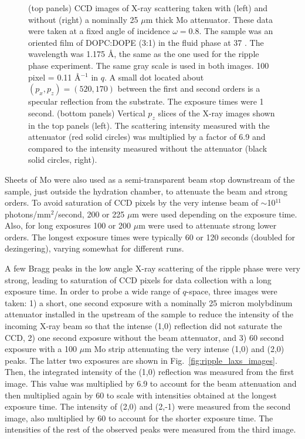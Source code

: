 \begin{figure}[jtbp]
  \caption{(top panels) CCD images of X-ray scattering taken with (left) and without 
  (right) a nominally 25 $\mu$m thick Mo attenuator. These data were taken 
  at a fixed angle of incidence $\omega=0.8$\textdegree. The sample was an oriented film of 
  DOPC:DOPE (3:1) in the fluid phase at 37 \textcelsius. The wavelength
  was 1.175 \AA, the same as the one used for the ripple phase experiment.
  The same gray scale is used in both images. 100 pixel =  0.11 \AA$^{-1}$ in $q$. 
  A small dot located about $(p_x,p_z)=(520,170)$ between the first and second orders is 
  a specular reflection from the substrate. The exposure times were 1 second. 
  (bottom panels) Vertical $p_z$ slices of the X-ray images shown in the top panels (left).
  The scattering intensity measured with the attenuator (red solid circles) 
  was multiplied by a factor of 6.9 and compared to the intensity measured 
  without the attenuator (black solid circles, right).}
  \label{fig:olddopc}
\end{figure}

Sheets of Mo were also used as a semi-transparent beam stop downstream of the 
sample, just 
outside the hydration chamber, to attenuate the beam and strong orders.  
To avoid saturation of CCD pixels by
the very intense beam of $\sim$10$^{11}$ photons/mm$^2$/second, 200 or 225 $\mu$m 
were used depending on the exposure time.  Also, for long exposures 100 or 200 
$\mu$m were used to attenuate strong lower orders.  The longest exposure times 
were typically 60 or 120 seconds (doubled for dezingering), varying somewhat for 
different runs.

A few Bragg peaks in the low angle X-ray scattering of the ripple phase
were very strong, leading to saturation of CCD pixels for data collection
with a long exposure time. 
In order to probe a wide range of $q$-space, three images were taken:
1) a short, one second exposure with a nominally 25 micron 
molybdinum attenuator installed in the upstream of the sample to reduce the 
intensity
of the incoming X-ray beam so that the intense (1,0) reflection did not 
saturate the CCD, 2) one second exposure without the beam attenuator,
and 3) 60 second exposure with a 100 $\mu$m Mo strip attenuating the very 
intense 
(1,0) and (2,0) peaks. The latter two exposures are shown in 
Fig.~\ref{fig:ripple_laxs_images}. 
Then, the integrated intensity of the (1,0) reflection was measured
from the first image. This value was multiplied by 6.9 to account for the beam
attenuation and then multiplied again by 60 to scale with intensities obtained 
at the longest exposure time. 
The intensity of (2,0) and (2,-1) were measured from the second image, also
multiplied by 60 to account for the shorter exposure time. The intensities of
the rest of the observed peaks were measured from the third image.


